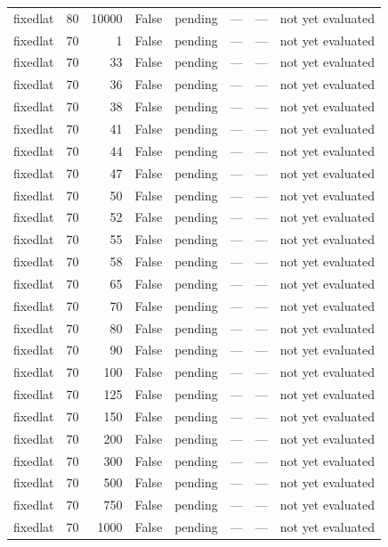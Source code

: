 \begin{tabular}{lrrrlrrl}
fixedlat & 80 & 10000 & False & pending & — & — & not yet evaluated \\
fixedlat & 70 & 1 & False & pending & — & — & not yet evaluated \\
fixedlat & 70 & 33 & False & pending & — & — & not yet evaluated \\
fixedlat & 70 & 36 & False & pending & — & — & not yet evaluated \\
fixedlat & 70 & 38 & False & pending & — & — & not yet evaluated \\
fixedlat & 70 & 41 & False & pending & — & — & not yet evaluated \\
fixedlat & 70 & 44 & False & pending & — & — & not yet evaluated \\
fixedlat & 70 & 47 & False & pending & — & — & not yet evaluated \\
fixedlat & 70 & 50 & False & pending & — & — & not yet evaluated \\
fixedlat & 70 & 52 & False & pending & — & — & not yet evaluated \\
fixedlat & 70 & 55 & False & pending & — & — & not yet evaluated \\
fixedlat & 70 & 58 & False & pending & — & — & not yet evaluated \\
fixedlat & 70 & 65 & False & pending & — & — & not yet evaluated \\
fixedlat & 70 & 70 & False & pending & — & — & not yet evaluated \\
fixedlat & 70 & 80 & False & pending & — & — & not yet evaluated \\
fixedlat & 70 & 90 & False & pending & — & — & not yet evaluated \\
fixedlat & 70 & 100 & False & pending & — & — & not yet evaluated \\
fixedlat & 70 & 125 & False & pending & — & — & not yet evaluated \\
fixedlat & 70 & 150 & False & pending & — & — & not yet evaluated \\
fixedlat & 70 & 200 & False & pending & — & — & not yet evaluated \\
fixedlat & 70 & 300 & False & pending & — & — & not yet evaluated \\
fixedlat & 70 & 500 & False & pending & — & — & not yet evaluated \\
fixedlat & 70 & 750 & False & pending & — & — & not yet evaluated \\
fixedlat & 70 & 1000 & False & pending & — & — & not yet evaluated \\

\end{tabular}
